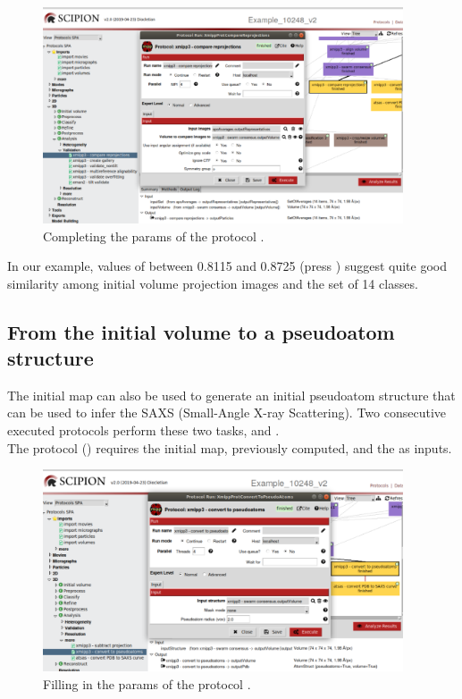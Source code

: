 \begin{figure}[H]
  \centering
  \captionsetup{width=.8\linewidth} 
  \includegraphics[width=0.95\textwidth]
  {images/xmipp_compare_reprojections.pdf}
  \caption{Completing the params of the protocol .}
  \label{fig:xmipp_compare_reprojections}
  \end{figure}
  
In our example, values of  between 0.8115 and 0.8725 (press ) suggest quite good similarity among initial volume projection images and the set of 14  classes.\\

\subsection*{From the initial volume to a pseudoatom structure}
The initial map can also be used to generate an initial pseudoatom structure that can be used to infer the SAXS (Small-Angle X-ray Scattering). Two consecutive executed protocols perform these two tasks,  and .\\

The protocol  () requires the initial map, previously computed, and the  as inputs.

\begin{figure}[H]
  \centering
  \captionsetup{width=.8\linewidth} 
  \includegraphics[width=0.95\textwidth]
  {images/xmipp_convert_to_pseudoatoms.pdf}
  \caption{Filling in the params of the protocol .}
  \label{fig:xmipp_convert_to_pseudoatoms}
  \end{figure}

